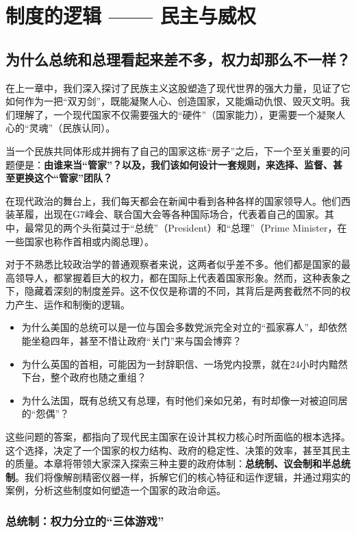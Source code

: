 
\part{制度的逻辑 —— 民主与威权}

\chapter{为什么总统和总理看起来差不多，权力却那么不一样？}

在上一章中，我们深入探讨了民族主义这股塑造了现代世界的强大力量，见证了它如何作为一把“双刃剑”，既能凝聚人心、创造国家，又能煽动仇恨、毁灭文明。我们理解了，一个现代国家不仅需要强大的“硬件”（国家能力），更需要一个凝聚人心的“灵魂”（民族认同）。

当一个民族共同体形成并拥有了自己的国家这栋“房子”之后，下一个至关重要的问题便是：\textbf{由谁来当“管家”？以及，我们该如何设计一套规则，来选择、监督、甚至更换这个“管家”团队？}

在现代政治的舞台上，我们每天都会在新闻中看到各种各样的国家领导人。他们西装革履，出现在G7峰会、联合国大会等各种国际场合，代表着自己的国家。其中，最常见的两个头衔莫过于“总统”（President）和“总理”（Prime Minister，在一些国家也称作首相或内阁总理）。

对于不熟悉比较政治学的普通观察者来说，这两者似乎差不多。他们都是国家的最高领导人，都掌握着巨大的权力，都在国际上代表着国家形象。然而，这种表象之下，隐藏着深刻的制度差异。这不仅仅是称谓的不同，其背后是两套截然不同的权力产生、运作和制衡的逻辑。

\begin{itemize}
    \item 为什么美国的总统可以是一位与国会多数党派完全对立的“孤家寡人”，却依然能坐稳四年，甚至不惜让政府“关门”来与国会博弈？
    \item 为什么英国的首相，可能因为一封辞职信、一场党内投票，就在24小时内黯然下台，整个政府也随之重组？
    \item 为什么法国，既有总统又有总理，有时他们亲如兄弟，有时却像一对被迫同居的“怨偶”？
\end{itemize}

这些问题的答案，都指向了现代民主国家在设计其权力核心时所面临的根本选择。这个选择，决定了一个国家的权力结构、政府的稳定性、决策的效率，甚至其民主的质量。本章将带领大家深入探索三种主要的政府体制：\textbf{总统制、议会制和半总统制}。我们将像解剖精密仪器一样，拆解它们的核心特征和运作逻辑，并通过翔实的案例，分析这些制度如何塑造一个国家的政治命运。

\hrulefill

\section{总统制：权力分立的“三体游戏”}


